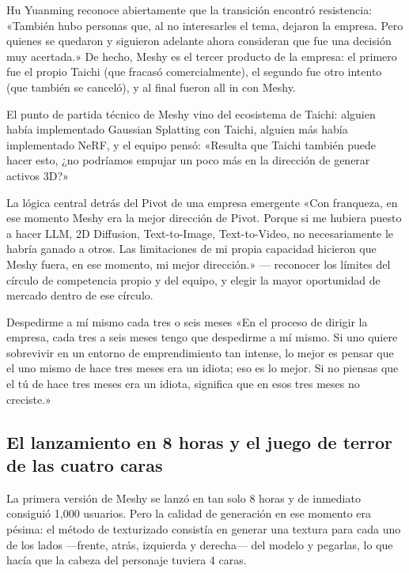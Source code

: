 Hu Yuanming reconoce abiertamente que la transición encontró resistencia: «También hubo personas que, al no interesarles el tema, dejaron la empresa. Pero quienes se quedaron y siguieron adelante ahora consideran que fue una decisión muy acertada.» De hecho, Meshy es el tercer producto de la empresa: el primero fue el propio Taichi (que fracasó comercialmente), el segundo fue otro intento (que también se canceló), y al final fueron all in con Meshy.

El punto de partida técnico de Meshy vino del ecosistema de Taichi: alguien había implementado Gaussian Splatting con Taichi, alguien más había implementado NeRF, y el equipo pensó: «Resulta que Taichi también puede hacer esto, ¿no podríamos empujar un poco más en la dirección de generar activos 3D?»

\begin{importantbox}{La lógica central detrás del Pivot de una empresa emergente}
«Con franqueza, en ese momento Meshy era la mejor dirección de Pivot. Porque si me hubiera puesto a hacer LLM, 2D Diffusion, Text-to-Image, Text-to-Video, no necesariamente le habría ganado a otros. Las limitaciones de mi propia capacidad hicieron que Meshy fuera, en ese momento, mi mejor dirección.» — reconocer los límites del círculo de competencia propio y del equipo, y elegir la mayor oportunidad de mercado dentro de ese círculo.
\end{importantbox}

\begin{importantbox}{Despedirme a mí mismo cada tres o seis meses}
«En el proceso de dirigir la empresa, cada tres a seis meses tengo que despedirme a mí mismo. Si uno quiere sobrevivir en un entorno de emprendimiento tan intense, lo mejor es pensar que el uno mismo de hace tres meses era un idiota; eso es lo mejor. Si no piensas que el tú de hace tres meses era un idiota, significa que en esos tres meses no creciste.»
\end{importantbox}

\subsection{El lanzamiento en 8 horas y el juego de terror de las cuatro caras}

La primera versión de Meshy se lanzó en tan solo 8 horas y de inmediato consiguió 1,000 usuarios. Pero la calidad de generación en ese momento era pésima: el método de texturizado consistía en generar una textura para cada uno de los lados —frente, atrás, izquierda y derecha— del modelo y pegarlas, lo que hacía que la cabeza del personaje tuviera 4 caras.

